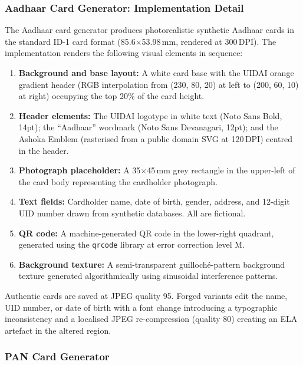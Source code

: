\documentclass[12pt,a4paper,oneside]{report}
\begin{document}
\subsubsection{Aadhaar Card Generator: Implementation Detail}

The Aadhaar card generator produces photorealistic synthetic Aadhaar cards in
the standard ID-1 card format (85.6$\times$53.98\,mm, rendered at 300\,DPI).
The implementation renders the following visual elements in sequence:

\begin{enumerate}
\item \textbf{Background and base layout:} A white card base with the UIDAI
orange gradient header (RGB interpolation from (230, 80, 20) at left to
(200, 60, 10) at right) occupying the top 20\% of the card height.

\item \textbf{Header elements:} The UIDAI logotype in white text (Noto Sans
Bold, 14pt); the ``Aadhaar'' wordmark (Noto Sans Devanagari,
12pt); and the Ashoka Emblem (rasterised from a public domain SVG at 120\,DPI)
centred in the header.

\item \textbf{Photograph placeholder:} A 35$\times$45\,mm grey rectangle in
the upper-left of the card body representing the cardholder photograph.

\item \textbf{Text fields:} Cardholder name, date of birth, gender, address,
and 12-digit UID number drawn from synthetic databases. All are fictional.

\item \textbf{QR code:} A machine-generated QR code in the lower-right quadrant,
generated using the \texttt{qrcode} library at error correction level M.

\item \textbf{Background texture:} A semi-transparent guilloch\'{e}-pattern
background texture generated algorithmically using sinusoidal interference
patterns.
\end{enumerate}

Authentic cards are saved at JPEG quality 95. Forged variants edit the name,
UID number, or date of birth with a font change introducing a typographic
inconsistency and a localised JPEG re-compression (quality 80) creating an ELA
artefact in the altered region.

\subsubsection{PAN Card Generator}
\end{document}
